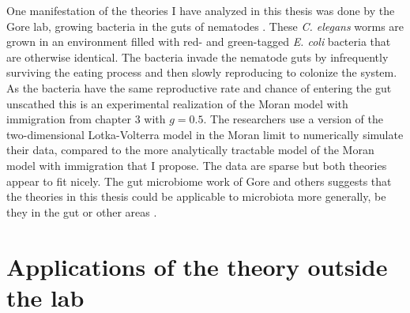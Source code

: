 One manifestation of the theories I have analyzed in this thesis was done by the Gore lab, growing bacteria in the guts of nematodes \cite{Vega2017}. 
These \emph{C. elegans} worms are grown in an environment filled with red- and green-tagged \emph{E. coli} bacteria that are otherwise identical. 
The bacteria invade the nematode guts by infrequently surviving the eating process and then slowly reproducing to colonize the system. %
As the bacteria have the same reproductive rate and chance of entering the gut unscathed this is an experimental realization of the Moran model with immigration from chapter 3 with $g=0.5$. 
The researchers use a version of the two-dimensional Lotka-Volterra model in the Moran limit to numerically simulate their data, compared to the more analytically tractable model of the Moran model with immigration that I propose. 
The data are sparse but both theories appear to fit nicely. 
The gut microbiome work of Gore and others \cite{Vega2017,Roeselers2011} suggests that the theories in this thesis could be applicable to microbiota more generally, be they in the gut or other areas \cite{Manichanh2010,Koenig2011,Theriot2014,Wolfe2014,Fisher2015,Coburn2015,Datta2016}. %


\iffalse
\section{Applications of the theory outside the lab}%

